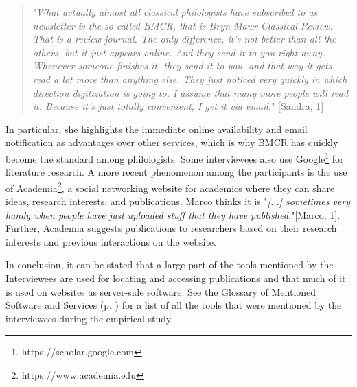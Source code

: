 \documentclass[12pt, a4paper, titlepage, oneside, abstract=true, toc=listof, toc=bibliography]{scrreprt}
\begin{document}
\begin{quotation}
"\textit{What actually almost all classical philologists have subscribed to as newsletter is the so-called BMCR, that is Bryn Mawr Classical Review. That is a review journal. The only difference, it's not better than all the others, but it just appears online. And they send it to you right away. Whenever someone finishes it, they send it to you, and that way it gets read a lot more than anything else. They just noticed very quickly in which direction digitization is going to. I assume that many more people will read it. Because it's just totally convenient, I get it via email.}" [Sandra, 1]
\end{quotation}

In particular, she highlights the immediate online availability and email notification as advantages over other services, which is why BMCR has quickly become the standard among philologists. %
Some interviewees also use \gls{Google}\footnote{https://scholar.google.com} for literature research. 
A more recent phenomenon among the participants is the use of \gls{Academia}\footnote{https://www.academia.edu}, a social networking website for academics where they can share ideas, research interests, and publications. Marco thinks it is "\textit{[...] sometimes very handy when people have just uploaded stuff that they have published.}"[Marco, 1]. Further, Academia suggests publications to researchers based on their research interests and previous interactions on the website.

In conclusion, it can be stated that a large part of the tools mentioned by the Interviewees are used for locating and accessing publications and that much of it is used on websites as server-side software. See the Glossary of Mentioned Software and Services (p. \pageref{sec:glossary}) for a list of all the tools that were mentioned by the interviewees during the empirical study.
\end{document}
